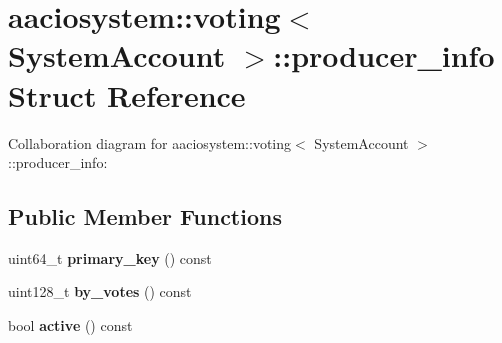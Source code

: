 \hypertarget{structaaciosystem_1_1voting_1_1producer__info}{}\section{aaciosystem\+:\+:voting$<$ System\+Account $>$\+:\+:producer\+\_\+info Struct Reference}
\label{structaaciosystem_1_1voting_1_1producer__info}


Collaboration diagram for aaciosystem\+:\+:voting$<$ System\+Account $>$\+:\+:producer\+\_\+info\+:
\subsection*{Public Member Functions}
\begin{DoxyCompactItemize}
\item 
\mbox{\label{structaaciosystem_1_1voting_1_1producer__info_a16b9d1fd92d9001103cb2269201b8a6c}} 
uint64\+\_\+t {\bfseries primary\+\_\+key} () const
\item 
\mbox{\label{structaaciosystem_1_1voting_1_1producer__info_a2026869a24bd955791315d1c17cf371f}} 
uint128\+\_\+t {\bfseries by\+\_\+votes} () const
\item 
\mbox{\label{structaaciosystem_1_1voting_1_1producer__info_a1ec05d278387d93dee635af1bb7c9324}} 
bool {\bfseries active} () const
\end{DoxyCompactItemize}
